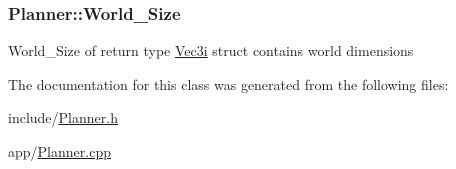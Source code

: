 \subsubsection[{\texorpdfstring{World\+\_\+\+Size}{World_Size}}]{ Planner\+::\+World\+\_\+\+Size}\hypertarget{classPlanner_a27c77443f0cf3e6b5197c0c3af56c3ca}{}\label{classPlanner_a27c77443f0cf3e6b5197c0c3af56c3ca}
World\+\_\+\+Size of return type \hyperlink{structVec3i}{Vec3i} struct contains world dimensions 

The documentation for this class was generated from the following files\+:\begin{DoxyCompactItemize}
\item 
include/\hyperlink{Planner_8h}{Planner.\+h}\item 
app/\hyperlink{Planner_8cpp}{Planner.\+cpp}\end{DoxyCompactItemize}

